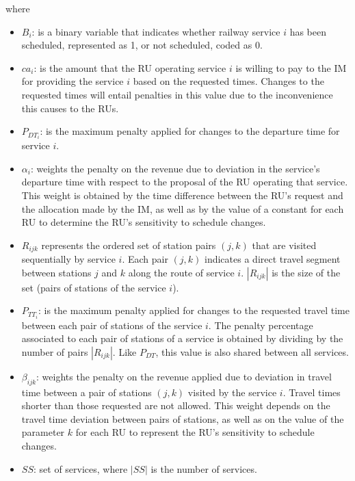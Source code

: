\documentclass[Afour,sagev,times]{sagej}
\begin{document}
where \begin{itemize}
    \item $B_i$: is a binary variable that indicates whether railway service $i$ has been scheduled, represented as 1, or not scheduled, coded as 0. 
    \item $ca_i$: is the amount that the \gls{RU} operating service $i$ is willing to pay to the \gls{IM} for providing the service $i$ based on the requested times. Changes to the requested times will entail penalties in this value due to the inconvenience this causes to the \glspl{RU}.
    \item $P_{DT_{i}}$: is the maximum penalty applied for changes to the departure time for service $i$.
    \item $\alpha_{i}$: weights the penalty on the revenue due to deviation in the service's departure time with respect to the proposal of the \gls{RU} operating that service. This weight is obtained by the time difference between the \gls{RU}'s request and the allocation made by the \gls{IM}, as well as by the value of a constant for each \gls{RU} to determine the \gls{RU}'s sensitivity to schedule changes.
    \item $ R_{ijk} $ represents the ordered set of station pairs $ (j,k) $ that are visited sequentially by service $i$. Each pair $(j,k)$ indicates a direct travel segment between stations $j$ and $k$ along the route of service $i$. $|R_{ijk}|$ is the size of the set (pairs of stations of the service $i$).
    \item $P_{TT_{i}}$: is the maximum penalty applied for changes to the requested travel time between each pair of stations of the service $i$. The penalty percentage associated to each pair of stations of a service is obtained by dividing by the number of pairs $|R_{ijk}|$. Like $P_{DT}$, this value is also shared between all services.
    \item $\beta_{ijk}$: weights the penalty on the revenue applied due to deviation in travel time between a pair of stations $(j,k)$ visited by the service $i$. Travel times shorter than those requested are not allowed. This weight depends on the travel time deviation between pairs of stations, as well as on the value of the parameter $k$ for each \gls{RU} to represent the \gls{RU}'s sensitivity to schedule changes.
    \item $ SS $: set of services, where $ |SS| $ is the number of services.
\end{itemize}
\end{document}
